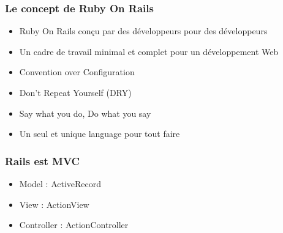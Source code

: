\documentclass{beamer}
\begin{document}
\begin{frame}
    \frametitle{Le concept de Ruby On Rails}
    \begin{itemize}
        \item Ruby On Rails conçu par des développeurs pour des développeurs
        \item Un cadre de travail minimal et complet pour un développement Web
        \item Convention over Configuration
        \item Don't Repeat Yourself (DRY)
        \item Say what you do, Do what you say
        \item Un seul et unique language pour tout faire
    \end{itemize}
\end{frame}

\begin{frame}
    \frametitle{Rails est MVC}
    \begin{itemize}
        \item Model : ActiveRecord
        \item View : ActionView
        \item Controller : ActionController
    \end{itemize}
\end{frame}
\end{document}
